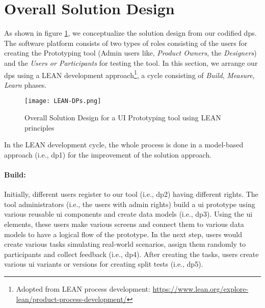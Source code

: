 \clearpage
\section{Overall Solution Design}
\label{design:section:solutiondesign}
As shown in figure \ref{fig:design:lean}, we conceptualize the solution design from our codified \ac{dp}s.
The software platform consists of two types of roles consisting of the users for creating the Prototyping tool (Admin users like, \textit{Product Owners}, the \textit{Designers}) and the \textit{Users or Participants} for testing the tool.
In this section, we arrange our \ac{dp}s using a LEAN development approach\footnote{Adopted from LEAN process development: \url{https://www.lean.org/explore-lean/product-process-development/}}, a cycle consisting of \textit{Build}, \textit{Measure}, \textit{Learn} phases.

\begin{figure}[htbp!]
  \centering    
  \texttt{[image: LEAN-DPs.png]}
  \caption[Solution Concept]{Overall Solution Design for a UI Prototyping tool using LEAN principles}
  \label{fig:design:lean}
\end{figure}

In the LEAN development cycle, the whole process is done in a model-based approach (i.e., \ac{dp}1) for the improvement of the solution approach.
\paragraph{Build:}
\label{design:paragraph:build}
Initially, different users register to our tool (i.e., \ac{dp}2) having different rights. 
The tool administrators (i.e., the users with admin rights) build a \ac{ui} prototype using various reusable \ac{ui} components and create data models (i.e., \ac{dp}3). 
Using the \ac{ui} elements, these users make various screens and connect them to various data models to have a logical flow of the prototype.
In the next step, users would create various tasks simulating real-world scenarios, assign them randomly to participants and collect feedback (i.e., \ac{dp}4).
After creating the tasks, users create various \ac{ui} variants or versions for creating split tests (i.e., \ac{dp}5).

